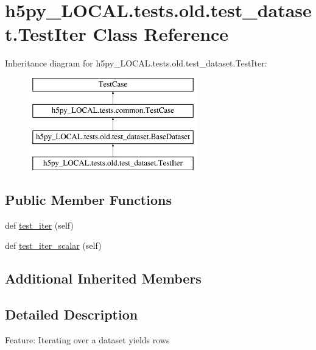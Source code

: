 \hypertarget{classh5py__LOCAL_1_1tests_1_1old_1_1test__dataset_1_1TestIter}{}\section{h5py\+\_\+\+L\+O\+C\+A\+L.\+tests.\+old.\+test\+\_\+dataset.\+Test\+Iter Class Reference}
\label{classh5py__LOCAL_1_1tests_1_1old_1_1test__dataset_1_1TestIter}
Inheritance diagram for h5py\+\_\+\+L\+O\+C\+A\+L.\+tests.\+old.\+test\+\_\+dataset.\+Test\+Iter\+:\begin{figure}[H]
\begin{center}
\leavevmode
\includegraphics[height=4.000000cm]{classh5py__LOCAL_1_1tests_1_1old_1_1test__dataset_1_1TestIter}
\end{center}
\end{figure}
\subsection*{Public Member Functions}
\begin{DoxyCompactItemize}
\item 
def \hyperlink{classh5py__LOCAL_1_1tests_1_1old_1_1test__dataset_1_1TestIter_a02780036814c16e83ad043c9b3ae682d}{test\+\_\+iter} (self)
\item 
def \hyperlink{classh5py__LOCAL_1_1tests_1_1old_1_1test__dataset_1_1TestIter_ac4de847f00f228a7475b820aca13ff29}{test\+\_\+iter\+\_\+scalar} (self)
\end{DoxyCompactItemize}
\subsection*{Additional Inherited Members}


\subsection{Detailed Description}
\begin{DoxyVerb}    Feature: Iterating over a dataset yields rows
\end{DoxyVerb}
 

